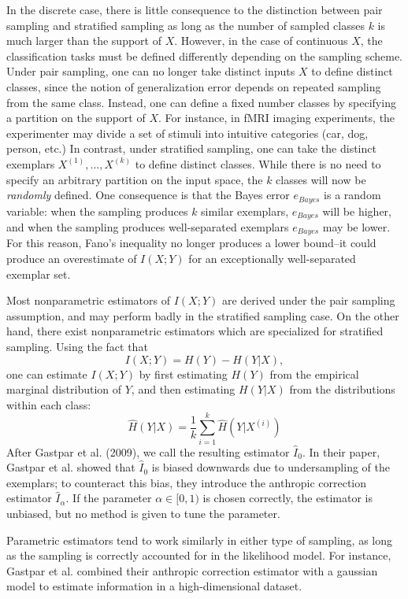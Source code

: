 \documentclass{article}
\begin{document}
In the discrete case, there is little consequence to the distinction between pair sampling and stratified sampling as long as the number of sampled classes $k$ is much larger than the support of $X$.
However, in the case of continuous $X$, the classification tasks must be defined differently depending on the sampling scheme.  Under pair sampling, one can no longer take distinct inputs $X$ to define distinct classes, since the notion of generalization error depends on repeated sampling from the same class.  Instead, one can define a fixed number classes by specifying a partition on the support of $X$.  For instance, in fMRI imaging experiments, the experimenter may divide a set of stimuli into intuitive categories (car, dog, person, etc.)  In contrast, under stratified sampling, one can take the distinct exemplars $X^{(1)},\hdots, X^{(k)}$ to define distinct classes.  While there is no need to specify an arbitrary partition on the input space, the $k$ classes will now be \emph{randomly} defined.  One consequence is that the Bayes error $e_{Bayes}$ is a random variable: when the sampling produces $k$ similar exemplars, $e_{Bayes}$ will be higher, and when the sampling produces well-separated exemplars $e_{Bayes}$ may be lower.  For this reason, Fano's inequality no longer produces a lower bound--it could produce an overestimate of $I(X; Y)$ for an exceptionally well-separated exemplar set.

Most nonparametric estimators of $I(X; Y)$ are derived under the pair sampling assumption, and may perform badly in the stratified sampling case.  On the other hand, there exist nonparametric estimators which are specialized for stratified sampling.  Using the fact that
\[
I(X; Y) = H(Y) - H(Y|X),
\]
one can estimate $I(X; Y)$ by first estimating $H(Y)$ from the empirical marginal distribution of $Y$, and then estimating $H(Y|X)$ from the distributions within each class:
\[
\hat{H}(Y|X)  = \frac{1}{k} \sum_{i=1}^k \hat{H}(Y|X^{(i)})
\]
After Gastpar et al. (2009), we call the resulting estimator $\hat{I}_0$.
In their paper, Gastpar et al. showed that $\hat{I}_0$ is biased downwards due to undersampling of the exemplars;
to counteract this bias, they introduce the anthropic correction estimator $\hat{I}_\alpha$.
If the parameter $\alpha \in [0, 1)$ is chosen correctly, the estimator is unbiased, but no method is given to tune the parameter.

Parametric estimators tend to work similarly in either type of sampling,
as long as the sampling is correctly accounted for in the likelihood model.
For instance, Gastpar et al. combined their anthropic correction estimator with a gaussian model
to estimate information in a high-dimensional dataset.
\end{document}
